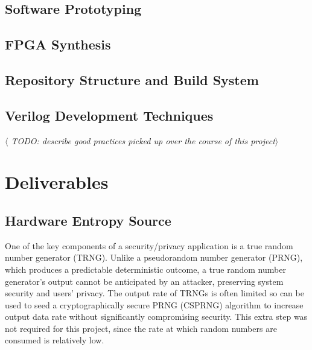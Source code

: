 \documentclass[12pt]{article}
\begin{document}
  \subsection{Software Prototyping}

  \subsection{FPGA Synthesis}

  \subsection{Repository Structure and Build System}

  \subsection{Verilog Development Techniques}
    \textit{$\langle$ TODO: describe good practices picked up over the course of this project$\rangle$}

\newpage



%
%

\section{Deliverables}
  \subsection{Hardware Entropy Source}
    One of the key components of a security/privacy application is a true random number generator (TRNG). Unlike a pseudorandom number generator (PRNG), which produces a predictable deterministic outcome, a true random number generator's output cannot be anticipated by an attacker, preserving system security and users' privacy. The output rate of TRNGs is often limited so can be used to seed a cryptographically secure PRNG (CSPRNG) algorithm to increase output data rate without significantly compromising security. This extra step was not required for this project, since the rate at which random numbers are consumed is relatively low.
\end{document}
